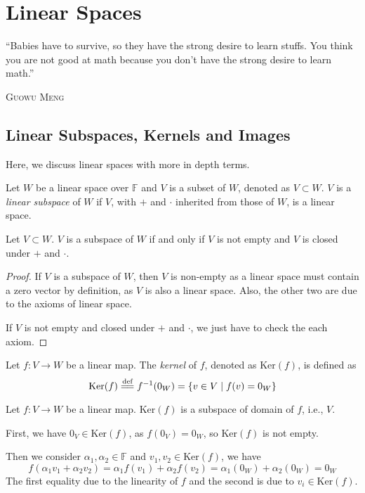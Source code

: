 \documentclass[
	11pt, %
	fleqn, %
	a4paper, %
]{LegrandOrangeBook}
\renewcommand{\ker}[1]{\text{Ker}(#1)} %
\newcommand{\F}{\mathbb{F}} %
\let\originalepigraph\epigraph
\renewcommand\epigraph[2]{\originalepigraph{#1}{\textsc{#2}}}
\begin{document}
\chapter{Linear Spaces}

\epigraph{``Babies have to survive, so they have the strong desire to learn stuffs. You think you are not good at math because you don't have the strong desire to learn math.''}{Guowu Meng}

\section{Linear Subspaces, Kernels and Images}

Here, we discuss linear spaces with more in depth terms.

\begin{definition}
    Let $W$ be a linear space over $\F$ and $V$ is a subset of $W$, denoted as $V \subset W$. $V$ is a \emph{linear subspace} of $W$ if $V$, with $+$ and $\cdot$ inherited from those of $W$, is a linear space.
\end{definition}

\begin{proposition}
    Let $V \subset W$. $V$ is a subspace of $W$ if and only if $V$ is not empty and $V$ is closed under $+$ and $\cdot$.
\end{proposition}

\begin{proof}
    If $V$ is a subspace of $W$, then $V$ is non-empty as a linear space must contain a zero vector by definition, as $V$ is also a linear space. Also, the other two are due to the axioms of linear space.

    If $V$ is not empty and closed under $+$ and $\cdot$, we just have to check the each axiom.
\end{proof}

\begin{definition}[Kernels]
    Let $f : V \to W$ be a linear map. The \emph{kernel} of $f$, denoted as $\ker f$, is defined as 
    \[
        \ker f \overset{\text{def}}{=\joinrel=} f^{-1}(0_W) = \{ v \in V \mid f(v) = 0_W \}
    \]
\end{definition}

\begin{example}
    Let $f : V \to W$ be a linear map. $\ker f$ is a subspace of domain of $f$, i.e., $V$.
    
    First, we have $0_V \in \ker f$, as $f(0_V) = 0_W$, so $\ker f$ is not empty.

    Then we consider $\alpha_1, \alpha_2 \in \F$ and $v_1, v_2 \in \ker f$, we have
    \[
        f(\alpha_1 v_1 + \alpha_2 v_2) = \alpha_1 f(v_1) + \alpha_2 f(v_2) = \alpha_1 (0_W) + \alpha_2 (0_W) = 0_W
    \]
    The first equality due to the linearity of $f$ and the second is due to $v_i \in \ker f$.
\end{example}
\end{document}
